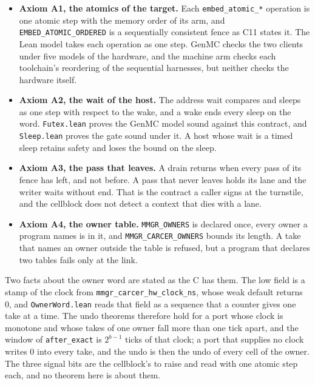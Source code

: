 \begin{itemize}
\item \textbf{Axiom A1, the atomics of the target.} Each \texttt{embed\_\allowbreak{}atomic\_\allowbreak{}*} operation is one atomic step with the memory order of its arm, and \texttt{EMBED\_\allowbreak{}ATOMIC\_\allowbreak{}ORDERED} is a sequentially consistent fence as C11 states it. The Lean model takes each operation as one step. GenMC checks the two clients under five models of the hardware, and the machine arm checks each toolchain's reordering of the sequential harnesses, but neither checks the hardware itself.
\item \textbf{Axiom A2, the wait of the host.} The address wait compares and sleeps as one step with respect to the wake, and a wake ends every sleep on the word. \texttt{Futex.\allowbreak{}lean} proves the GenMC model sound against this contract, and \texttt{Sleep.\allowbreak{}lean} proves the gate sound under it. A host whose wait is a timed sleep retains safety and loses the bound on the sleep.
\item \textbf{Axiom A3, the pass that leaves.} A drain returns when every pass of its fence has left, and not before. A pass that never leaves holds its lane and the writer waits without end. That is the contract a caller signs at the turnstile, and the cellblock does not detect a context that dies with a lane.
\item \textbf{Axiom A4, the owner table.} \texttt{MMGR\_\allowbreak{}OWNERS} is declared once, every owner a program names is in it, and \texttt{MMGR\_\allowbreak{}CARCER\_\allowbreak{}OWNERS} bounds its length. A take that names an owner outside the table is refused, but a program that declares two tables fails only at the link.
\end{itemize}

Two facts about the owner word are stated as the C has them. The low field is a stamp of the clock from \texttt{mmgr\_\allowbreak{}carcer\_\allowbreak{}hw\_\allowbreak{}clock\_\allowbreak{}ns}, whose weak default returns 0, and \texttt{Owner\allowbreak{}Word.\allowbreak{}lean} reads that field as a sequence that a counter gives one take at a time. The undo theorems therefore hold for a port whose clock is monotone and whose takes of one owner fall more than one tick apart, and the window of \texttt{after\_\allowbreak{}exact} is \(2^{b-1}\) ticks of that clock; a port that supplies no clock writes 0 into every take, and the undo is then the undo of every cell of the owner. The three signal bits are the cellblock's to raise and read with one atomic step each, and no theorem here is about them.

